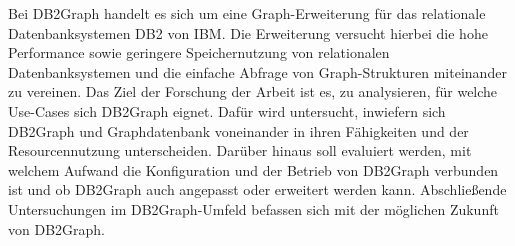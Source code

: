 Bei DB2Graph handelt es sich um eine Graph-Erweiterung für das relationale Datenbanksystemen DB2 von IBM. Die Erweiterung versucht hierbei die hohe Performance sowie geringere Speichernutzung von relationalen Datenbanksystemen und die einfache Abfrage von Graph-Strukturen miteinander zu vereinen. Das Ziel der Forschung der Arbeit ist es, zu analysieren, für welche Use-Cases sich DB2Graph eignet. Dafür wird untersucht, inwiefern sich DB2Graph und Graphdatenbank voneinander in ihren Fähigkeiten und der Resourcennutzung unterscheiden. Darüber hinaus soll evaluiert werden, mit welchem Aufwand die Konfiguration und der Betrieb von DB2Graph verbunden ist und ob DB2Graph auch angepasst oder erweitert werden kann. Abschließende Untersuchungen im DB2Graph-Umfeld befassen sich mit der möglichen Zukunft von DB2Graph.